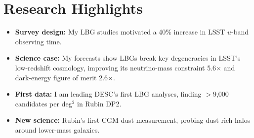 \section{Research Highlights}
\begin{itemize}[itemsep=0pt]
    \item \textbf{Survey design:} My LBG studies motivated a 40\% increase in LSST $u$-band observing time.
    \item \textbf{Science case:} My forecasts show LBGs break key degeneracies in LSST's low-redshift cosmology, improving its neutrino-mass constraint 5.6$\times$ and dark-energy figure of merit 2.6$\times$.
    \item \textbf{First data:} I am leading DESC's first LBG analyses, finding $>$9,000 candidates per deg$^2$ in Rubin DP2.
    \item \textbf{New science:} Rubin's first CGM dust measurement, probing dust-rich halos around lower-mass galaxies.
\end{itemize}
